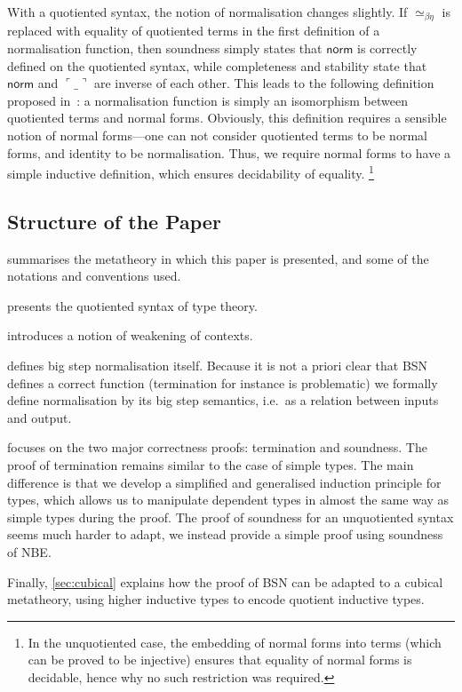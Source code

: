 \documentclass[a4paper,UKenglish,cleveref]{lipics-v2019}
\newcommand{\agdaSymb}[1]{\mathsf{#1}}
\newcommand{\norm}{\agdaSymb{norm}}
\newcommand{\cul}{\ulcorner}
\newcommand{\cur}{\urcorner}
\newcommand{\Beq}{\simeq_{\beta\eta}}
\begin{document}
With a quotiented syntax, the notion of normalisation changes slightly. If
$\Beq$ is replaced with equality of quotiented terms in the first definition
of a normalisation function, then soundness simply states that $\norm$ is
correctly defined on the quotiented syntax, while completeness and stability
state that $\norm$ and $\cul\_\cur$ are inverse of each other.  This leads to
the following definition proposed in~\cite{kaposi2016normalisation}: a
normalisation function is simply an isomorphism between quotiented terms and
normal forms. Obviously, this definition requires a sensible notion of normal
forms---one can not consider quotiented terms to be normal forms, and identity
to be normalisation. Thus, we require normal forms to have a simple inductive
definition, which ensures decidability of equality.%
\footnote{%
  In the unquotiented case, the embedding of normal forms into terms (which can
  be proved to be injective) ensures that equality of normal forms is decidable,
  hence why no such restriction was required.
}

\subsection{Structure of the Paper}
 summarises the metatheory in which this paper is
presented, and some of the notations and conventions used.

 presents the quotiented syntax of type theory.

 introduces a notion of weakening of contexts.

 defines big step normalisation itself. Because
it is not a priori clear that BSN defines a correct function (termination for
instance is problematic) we formally define normalisation by its big step
semantics, i.e.\ as a relation between inputs and output.

 focuses on the two major correctness proofs:
termination and soundness. The proof of termination remains similar to the case
of simple types. The main difference is that we develop a simplified and
generalised induction principle for types, which allows us to manipulate
dependent types in almost the same way as simple types during the proof.
The proof of soundness for an unquotiented syntax seems much harder to
adapt, we instead provide a simple proof using soundness of NBE.

Finally, \cref{sec:cubical} explains how the proof of BSN can be
adapted to a cubical metatheory, using higher inductive types to encode
quotient inductive types.
\end{document}
